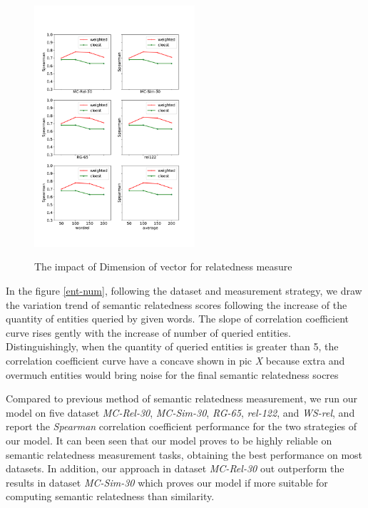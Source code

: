 \begin{figure}[H]
    \centering
    \includegraphics[width=0.53\textwidth]{pic/dim.pdf}\\
    \caption{The impact of Dimension of vector for relatedness measure}
    \label{dim}
\end{figure}



In the figure \ref{ent-num}, following the dataset and measurement strategy, we draw the variation trend
of semantic relatedness scores following the increase of the quantity of entities queried by given words.
The slope of correlation coefficient curve rises gently with the increase of number of queried entities.
Distinguishingly, when the quantity of queried entities is greater than 5, the correlation coefficient
curve have a concave shown in pic \emph{X} because extra and overmuch entities would bring noise for the final
semantic relatedness socres

Compared to previous method of semantic relatedness measurement, we run our model on five dataset
\emph{MC-Rel-30}, \emph{MC-Sim-30}, \emph{RG-65}, \emph{rel-122}, and \emph{WS-rel}, and report the
\emph{Spearman} correlation coefficient performance for the two strategies of our model. It can been
seen that our model proves to be highly reliable on semantic relatedness measurement tasks, obtaining
the best performance on most datasets. In addition, our approach in dataset \emph{MC-Rel-30} out outperform
the results in dataset \emph{MC-Sim-30} which proves our model if more suitable for computing semantic
relatedness than similarity. 

